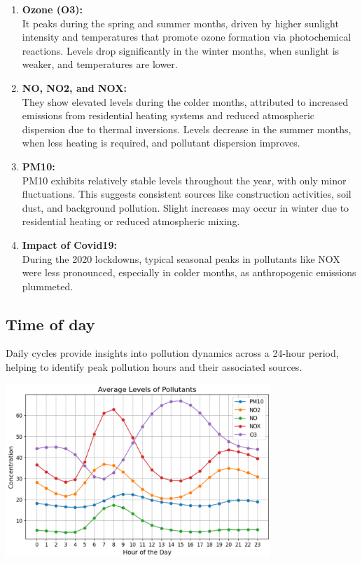 \documentclass{modeleRapport}
\begin{document}
\begin{enumerate}
    \item \textbf{Ozone (O3):}\\
    It peaks during the spring and summer months, driven by higher sunlight intensity and temperatures that promote ozone 
    formation via photochemical reactions. Levels drop significantly in the winter months, when sunlight is weaker, 
    and temperatures are lower.\\
    \item \textbf{NO, NO2, and NOX:}\\
    They show elevated levels during the colder months, attributed to increased emissions from residential heating systems 
    and reduced atmospheric dispersion due to thermal inversions. Levels decrease in the summer months, when less heating 
    is required, and pollutant dispersion improves.\\
    \item \textbf{PM10:}\\
    PM10 exhibits relatively stable levels throughout the year, with only minor fluctuations. This suggests consistent 
    sources like construction activities, soil dust, and background pollution. Slight increases may occur in winter due to 
    residential heating or reduced atmospheric mixing.\\
    \item \textbf{Impact of Covid19:}\\
    During the 2020 lockdowns, typical seasonal peaks in pollutants like NOX were less pronounced, 
    especially in colder months, as anthropogenic emissions plummeted.\\
\end{enumerate}

\subsection{Time of day}

Daily cycles provide insights into pollution dynamics across a 24-hour period, helping to identify peak pollution hours 
and their associated sources.\\

\begin{center}
    \includegraphics[width=10cm]{Images/PollutantsPerDay.png}
\end{center}
\end{document}
